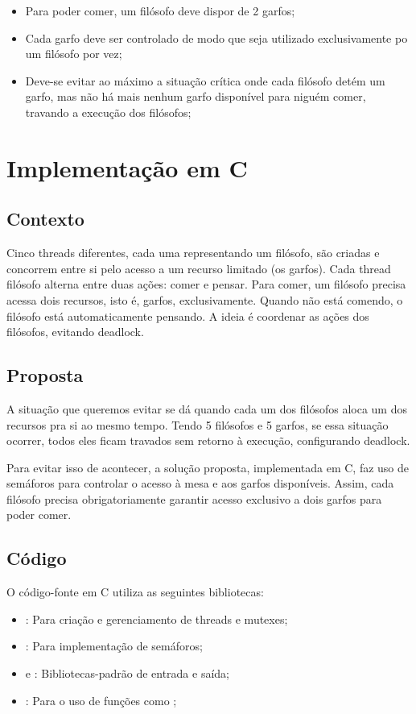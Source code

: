 \documentclass[
	12pt,				%
	openright,			%
	oneside,			%
	a4paper,			%
	chapter=TITLE,		%
	english,			%
	french,				%
	spanish,			%
	brazil				%
	]{abntex2}
\theoremstyle{definition}
\begin{document}
\begin{itemize}
    \item Para poder comer, um filósofo deve dispor de 2 garfos;
    \item Cada garfo deve ser controlado de modo que seja utilizado exclusivamente po um filósofo por vez;
    \item Deve-se evitar ao máximo a situação crítica onde cada filósofo detém um garfo, mas não há mais nenhum garfo disponível para niguém comer, travando a execução dos filósofos;
\end{itemize}

\section{Implementação em C}
\subsection{Contexto}
Cinco threads diferentes, cada uma representando um filósofo, são criadas e concorrem entre si pelo acesso a um recurso limitado (os garfos). Cada thread filósofo alterna entre duas ações: comer e pensar. Para comer, um filósofo precisa acessa dois recursos, isto é, garfos, exclusivamente. Quando não está comendo, o filósofo está automaticamente pensando. A ideia é coordenar as ações dos filósofos, evitando deadlock.
\subsection{Proposta}
A situação que queremos evitar se dá quando cada um dos filósofos aloca um dos recursos pra si ao mesmo tempo. Tendo 5 filósofos e 5 garfos, se essa situação ocorrer, todos eles ficam travados sem retorno à execução, configurando deadlock. 

Para evitar isso de acontecer, a solução proposta, implementada em C, faz uso de semáforos para controlar o acesso à mesa e aos garfos disponíveis. Assim, cada filósofo precisa obrigatoriamente garantir acesso exclusivo a dois garfos para poder comer.
\subsection{Código}

O código-fonte em C utiliza as seguintes bibliotecas:
\begin{itemize}
    \item \textbf{}: Para criação e gerenciamento de threads e mutexes;
    \item \textbf{}: Para implementação de semáforos;
    \item \textbf{} e \textbf{}: Bibliotecas-padrão de entrada e saída;
    \item \textbf{}: Para o uso de funções como ;
\end{itemize}
\end{document}
